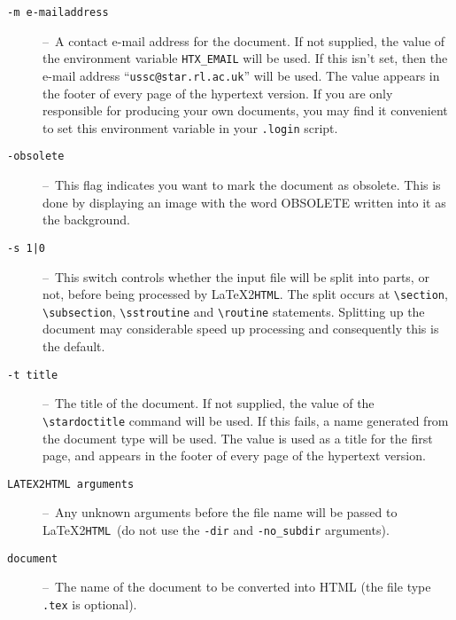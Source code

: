 \documentclass[twoside,11pt]{article}
\newcommand{\stardoctitle}     {Star2HTML\\[1ex]
                                Converting Starlink Documents to Hypertext}
\newcommand{\latextohtml}{\LaTeX2\texttt{HTML}}
\renewcommand{\_}{\texttt{\symbol{95}}}
\newcommand{\dash}{--}
\newcommand{\dash}{-}
\begin{document}
\begin{description}
\item[\texttt{-m e-mail\_address}] \dash\
   A contact e-mail address for the document.
   If not supplied, the value of the environment variable
   \verb#HTX_EMAIL# will be used.
   If this isn't set, then the e-mail address
   ``\texttt{ussc@star.rl.ac.uk}'' will be used.
   The value appears in the footer of every page of the hypertext version.
   If you are only responsible for producing your own documents, you may find
   it convenient to set this environment variable in your \texttt{.login}
   script.

\item[\texttt{-obsolete}] \dash\
   This flag indicates you want to mark the document as obsolete. This is
   done by displaying an image with the word OBSOLETE written into it as
   the background.

\item[\texttt{-s 1|0}] \dash\
   This switch controls whether the input file will be split
   into parts, or not, before being processed by \latextohtml.
   The split occurs at \verb#\section#, \verb#\subsection#,
   \verb#\sstroutine# and \verb#\routine# statements.
   Splitting up the document may considerable speed up processing and
   consequently this is the default.

\item[\texttt{-t title}] \dash\
   The title of the document.
   If not supplied, the value of the \verb#\stardoctitle# command will be used.
   If this fails, a name generated from the document type will be used.
   The value is used as a title for the first page, and appears in the footer of
   every page of the hypertext version.

\item[\texttt{LATEX2HTML arguments}] \dash\
   Any unknown arguments before the file name will be passed to \latextohtml\
   (do not use the \verb#-dir# and \verb#-no_subdir# arguments).

\item[\texttt{document}] \dash\
   The name of the document to be converted into HTML (the file type
   \texttt{.tex} is optional).

\end{description}
\end{document}
